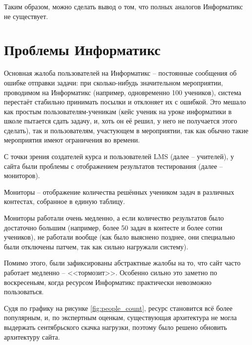 Таким образом, можно сделать вывод о том, что полных аналогов Информатикс не существует.

\section{Проблемы Информатикс}

Основная жалоба пользователей на Информатикс -- постоянные сообщения об ошибке отправки задачи:
при сколько-нибудь значительном мероприятии, проводимом на Информатикс (например, одновременно 100 учеников), система перестаёт стабильно принимать посылки и отклоняет их с ошибкой\cite{inf_not_working}. 
Это мешало как простым пользователям-ученикам 
(кейс ученик на уроке информатики в школе пытается сдать задачу, и, хоть он её решил, у него не получается этого сделать), 
так и пользователям, участующем в мероприятии, так как обычно такие мероприятия имеют ограничения во времени.

С точки зрения создателей курса и пользователей LMS (далее -- учителей),
у сайта были проблемы с отображением результатов тестирования (далее -- мониторов).

Мониторы -- отображение количества решённых учеником задач в различных контестах, собранное в единую таблицу.

Мониторы работали очень медленно, а если количество результатов было достаточно большим 
(например, более 50 задач в контесте и более сотни учеников), 
не работали вообще (как было выяснено позднее, они специально были отключены патчем, так как сильно нагружали систему).

Помимо этого, были зафиксированы абстрактные жалобы на то, что сайт часто работает медленно -- <<тормозит>>. 
Особенно сильно это заметно по воскресеньям, когда ресурсом Информатикс практически невозможно пользоваться.

Судя по графику на рисунке \ref{fig:people_count}, 
ресурс становится всё более популярным, и, по экспертным оценкам,
существующая архитектура не могла выдержать сентябрьского скачка нагрузки, 
поэтому было решено обновить архитектуру сайта.